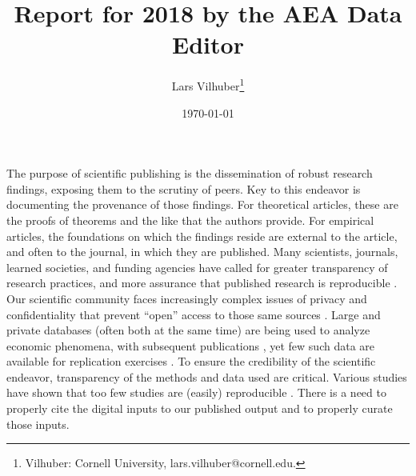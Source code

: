 \documentclass[AEJ]{AEA}
\begin{document}
\title{Report for 2018 by the AEA Data Editor }
\author{Lars Vilhuber\thanks{%
Vilhuber: Cornell University, lars.vilhuber@cornell.edu.}}
\date{\today}
\JEL{}




\maketitle


The purpose of scientific publishing is the dissemination of robust research findings, exposing them to the scrutiny of peers. Key to this endeavor is documenting the provenance of those findings. For theoretical articles, these are the proofs of theorems and the like that the authors provide. For empirical articles, the foundations on which the findings reside are external to the article, and often to the journal, in which they are published. Many scientists,  journals, learned societies, and funding agencies have called for greater transparency of research practices, and more assurance that published research is reproducible \citep{Stodden2016-uc,Fuentes2016-wz,Moffitt2016-wl,Camerer2016-kl,Bollen2015-vb,Joskow2015-hd,ChristensenTransparencyReproducibilityCredibility2018}. Our scientific community faces  increasingly complex issues of privacy and confidentiality that prevent ``open'' access to those same sources \citep{Anderson12009,abowdschmutte.aer.2018}. Large and private databases (often both at the same time) are being used to analyze economic phenomena, with subsequent publications \citep{BakerWagePolicyFirm1994,LazearAm.Econ.Rev.2000,BaileySocialConnectednessMeasurement2018,Chen2017,HallILRReview2018}, yet few such data are available for replication exercises \cite{JengAm.Econ.Rev.2016}. To ensure the credibility of the scientific endeavor, transparency of the methods and data used are critical. Various studies have shown that too few studies are (easily) reproducible \citep{McCullough2007-zx,McCullough2006-cz,AndersonJ.Econ.Methodol.2008,AndersonFed.ReserveBankStLouisRev.1994}. There is a need to properly cite the digital inputs to our published output and to properly curate those inputs.  
\end{document}
